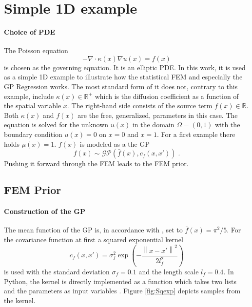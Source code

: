 \documentclass[%
  a4paper,oneside,%
  11pt,%
  smallchapters,
  style=printdev,
  extramargin,
  green,%
  rgb, <cmyk>
  ]{tubsbook}
\begin{document}
\section{Simple 1D example}
\paragraph{Choice of PDE}
The Poisson equation 
\begin{equation}
- \nabla \cdot \kappa(x) \nabla u(x) = f(x)
\label{eqn:Poisson}
\end{equation}
is chosen as the governing equation. It is an elliptic PDE. In this work, it is used as a simple 1D example to illustrate how the statistical FEM and especially the GP Regression works.
The most standard form of it does not, contrary to this example, include $\kappa(x) \in \mathbb{R}^+$ which is the diffusion coefficient as a function of the spatial variable $x$. The right-hand side consists of the source term $f(x)\in \mathbb{R}$. Both $\kappa (x)$ and $f(x)$ are the free, generalized, parameters in this case. The equation is solved for the unknown  $u(x)$ in the domain $\Omega = (0,1)$ with the boundary condition $u(x) = 0$ on $x=0$ and $x=1$.
%
For a first example there holds $\mu(x)=1$. $f(x)$ is modeled as a the GP \cite{girolami2021} 
%
\begin{equation}
f(x) \sim \mathcal{GP} \left( \bar{f}(x), c_f(x,x')\right) \;.
\end{equation}
%
Pushing it forward through the FEM leads to the FEM prior.




\subsection{FEM Prior}
\paragraph{Construction of the GP}
The mean function of the GP is, in accordance with \cite{girolami2021}, set to $\bar{f}(x) = \pi^2 / 5$. For the covariance function at first a squared exponential kernel 
%
\begin{equation}
c_f(x,x') =    \sigma_{f}^2 \exp \left(-  \frac{\left \| x-x' \right \|^2}{2l_{f}^2} \right )       
\label{eqn:sqEx_f}
\end{equation}
%
is used with the standard deviation $\sigma_{f} = 0.1$ and the length scale $l_{f} = 0.4$.
In Python, the kernel is directly implemented as a function which takes two lists and the parameters as input variables \cite{murphy2012}. Figure \ref{fig:Sqexp} depicts samples from the kernel.
\end{document}
